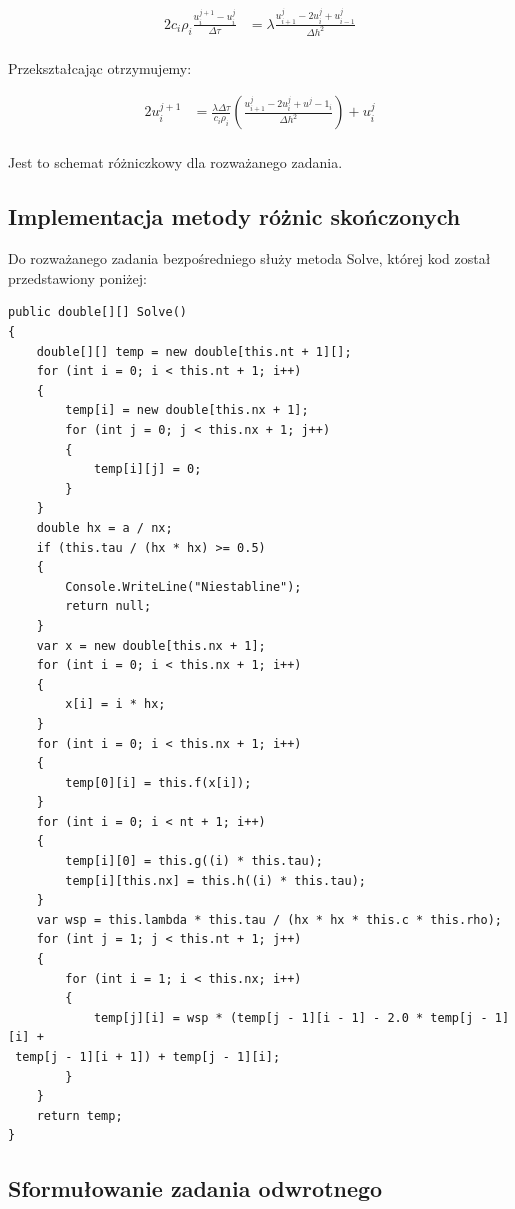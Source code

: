 \documentclass[twoside]{projektInzynierskiMS1}
\begin{document}
\begin{alignat*}{2}
c_i \rho _i \frac{ u^{j+1}_i - u^j_i}{ \Delta \tau}&= \lambda \frac{ u^j_{i+1} - 2u^j_i+u^j_{i-1}}{\Delta h^2}\\
\end{alignat*}

Przekształcając otrzymujemy:

\begin{alignat*}{2}
 u^{j+1}_i&= \frac{\lambda \Delta \tau}{c_i \rho _i} \left( \frac{u^j_{i+1} - 2u^j_i+u^j-1_i}{\Delta h^2} \right) + u^j_i\\
\end{alignat*}

Jest to schemat różniczkowy dla rozważanego zadania.

\subsection{Implementacja metody różnic skończonych}

Do rozważanego zadania bezpośredniego służy metoda Solve, której kod został przedstawiony poniżej:

\begin{verbatim}
public double[][] Solve()
{
    double[][] temp = new double[this.nt + 1][];
    for (int i = 0; i < this.nt + 1; i++)
    {
        temp[i] = new double[this.nx + 1];
        for (int j = 0; j < this.nx + 1; j++)
        {
            temp[i][j] = 0;
        }
    }
    double hx = a / nx;
    if (this.tau / (hx * hx) >= 0.5)
    {
        Console.WriteLine("Niestabline");
        return null;
    }
    var x = new double[this.nx + 1];
    for (int i = 0; i < this.nx + 1; i++)
    {
        x[i] = i * hx;
    }
    for (int i = 0; i < this.nx + 1; i++)
    {
        temp[0][i] = this.f(x[i]);
    }
    for (int i = 0; i < nt + 1; i++)
    {
        temp[i][0] = this.g((i) * this.tau);
        temp[i][this.nx] = this.h((i) * this.tau);
    }
    var wsp = this.lambda * this.tau / (hx * hx * this.c * this.rho);
    for (int j = 1; j < this.nt + 1; j++)
    {
        for (int i = 1; i < this.nx; i++)
        {
            temp[j][i] = wsp * (temp[j - 1][i - 1] - 2.0 * temp[j - 1][i] +
 temp[j - 1][i + 1]) + temp[j - 1][i];
        }
    }
    return temp;
}   
\end{verbatim}

\subsection{Sformułowanie zadania odwrotnego}
\end{document}
